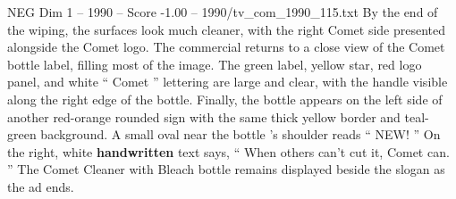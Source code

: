 \begin{textsample}{NEG Dim 1 – 1990 – Score -1.00 – 1990/tv\_com\_1990\_115.txt}
By the end of the wiping, the surfaces look much cleaner, with the right Comet side presented alongside the Comet logo.
The commercial returns to a close view of the Comet bottle label, filling most of the image.
The green label, yellow star, red logo panel, and white “ Comet ” lettering are large and clear, with the handle visible along the right edge of the bottle.
Finally, the bottle appears on the left side of another red-orange rounded sign with the same thick yellow border and teal-green background.
A small oval near the bottle ’s shoulder reads “ NEW! ” On the right, white \textbf{handwritten} text says, “ When others can't cut it, Comet can. ” The Comet Cleaner with Bleach bottle remains displayed beside the slogan as the ad ends.

\end{textsample}
